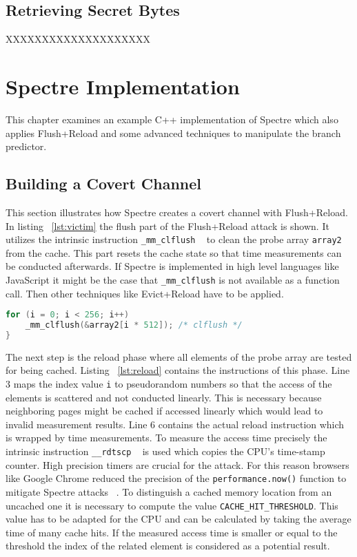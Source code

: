 \documentclass[a4paper,oneside,openright] {scrreprt}
\begin{document}
\subsection{Retrieving Secret Bytes}
\label{ch:intro:motivation:A}

XXXXXXXXXXXXXXXXXXXX

\section{Spectre Implementation}
\label{ch:intro:motivation}

This chapter examines an example C++ implementation of Spectre which also applies Flush+Reload and some advanced techniques
to manipulate the branch predictor.

\subsection{Building a Covert Channel}
\label{ch:intro:motivation:A}
 
This section illustrates how Spectre creates a covert channel with Flush+Reload. 
In listing ~\ref{lst:victim} the flush part of the Flush+Reload attack is shown. It utilizes the intrinsic instruction 
\texttt{\_mm\_clflush} ~\cite{intelintrinsics} to clean the probe array \texttt{array2} from the cache. This part resets the cache state
so that time measurements can be conducted afterwards. If Spectre is implemented in high level languages like JavaScript it
might be the case that \texttt{\_mm\_clflush} is not available as a function call. Then other techniques like Evict+Reload have
to be applied.

\begin{lstlisting}[language=C, caption=Spectre: Flush, label={lst:flush}]
for (i = 0; i < 256; i++)
    _mm_clflush(&array2[i * 512]); /* clflush */
}
\end{lstlisting}

The next step is the reload phase where all elements of the probe array are tested for being cached. 
Listing ~\ref{lst:reload} contains the instructions of this phase. Line 3 maps the index value \texttt{i} to pseudorandom numbers
 so that the access of the elements is scattered and not conducted linearly. 
 This is necessary because neighboring pages might be cached if 
accessed linearly which would lead to invalid measurement results. Line 6 contains the actual reload instruction which is wrapped 
by time measurements.
To measure the access time precisely the intrinsic instruction \texttt{\_\_rdtscp} ~\cite{intelintrinsics} is used which
copies the CPU's time-stamp counter. High precision timers are crucial for the attack. For this reason browsers like 
Google Chrome reduced the precision of the \texttt{performance.now()} function to mitigate Spectre attacks ~\cite{chromeSpectreMeltdown}.
To distinguish a cached memory location from an uncached one it is necessary to compute the value \texttt{CACHE\_HIT\_THRESHOLD}.
This value has to be adapted for the CPU and can be calculated by taking the average time of many cache hits.
If the measured access time is smaller or equal to the threshold the index of the related element is considered as a potential result.
\end{document}

